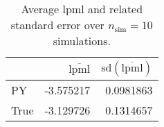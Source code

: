 \begin{table}[H]

\caption{Average lpml and related standard error over $n_{\text{sim}} = 10$ simulations.}
\centering
\begin{tabular}[t]{lrr}
\toprule
  & $\overbar{\text{lpml}}$ & $\text{sd}(\overbar{\text{lpml}})$\\
\midrule
PY & -3.575217 & 0.0981863\\
True & -3.129726 & 0.1314657\\
\bottomrule
\end{tabular}
\end{table}